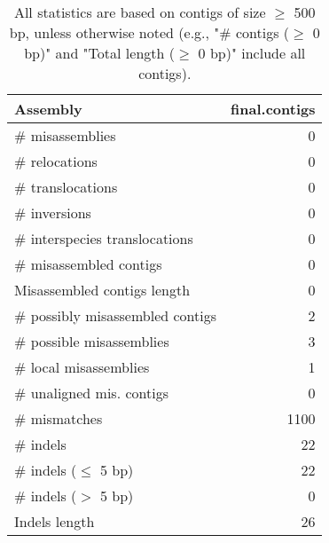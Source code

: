 \documentclass[12pt,a4paper]{article}
\begin{document}
\begin{table}[ht]
\begin{center}
\caption{All statistics are based on contigs of size $\geq$ 500 bp, unless otherwise noted (e.g., "\# contigs ($\geq$ 0 bp)" and "Total length ($\geq$ 0 bp)" include all contigs).}
\begin{tabular}{|l*{1}{|r}|}
\hline
Assembly & final.contigs \\ \hline
\# misassemblies & 0 \\ \hline
\hspace{5mm}\# relocations & 0 \\ \hline
\hspace{5mm}\# translocations & 0 \\ \hline
\hspace{5mm}\# inversions & 0 \\ \hline
\hspace{5mm}\# interspecies translocations & 0 \\ \hline
\# misassembled contigs & 0 \\ \hline
Misassembled contigs length & 0 \\ \hline
\# possibly misassembled contigs & 2 \\ \hline
\hspace{5mm}\# possible misassemblies & 3 \\ \hline
\# local misassemblies & 1 \\ \hline
\# unaligned mis. contigs & 0 \\ \hline
\# mismatches & 1100 \\ \hline
\# indels & 22 \\ \hline
\hspace{5mm}\# indels ($\leq$ 5 bp) & 22 \\ \hline
\hspace{5mm}\# indels ($>$ 5 bp) & 0 \\ \hline
Indels length & 26 \\ \hline
\end{tabular}
\end{center}
\end{table}
\end{document}
